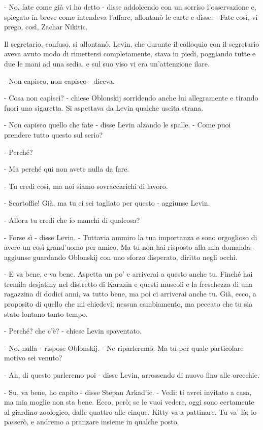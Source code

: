 - No, fate come già vi ho detto - disse addolcendo con un sorriso l'osservazione e, spiegato in breve come intendeva l'affare, allontanò le carte e disse: - Fate così, vi prego, così, Zachar Nikitic. 

Il segretario, confuso, si allontanò. Levin, che durante il colloquio con il segretario aveva avuto modo di rimettersi completamente, stava in piedi, poggiando tutte e due le mani ad una sedia, e sul suo viso vi era un'attenzione ilare. 

- Non capisco, non capisco - diceva. 

- Cosa non capisci? - chiese Oblonskij sorridendo anche lui allegramente e tirando fuori una sigaretta. Si aspettava da Levin qualche uscita strana. 

- Non capisco quello che fate - disse Levin alzando le spalle. - Come puoi prendere tutto questo sul serio? 

- Perché? 

- Ma perché qui non avete nulla da fare. 

- Tu credi così, ma noi siamo sovraccarichi di lavoro. 

- Scartoffie! Già, ma tu ci sei tagliato per questo - aggiunse Levin. 

- Allora tu credi che io manchi di qualcosa? 

- Forse sì - disse Levin. - Tuttavia ammiro la tua importanza e sono orgoglioso di avere un così grand'uomo per amico. Ma tu non hai risposto alla mia domanda - aggiunse guardando Oblonskij con uno sforzo disperato, diritto negli occhi. 

- E va bene, e va bene. Aspetta un po' e arriverai a questo anche tu. Finché hai tremila desjatiny nel distretto di Karazin e questi muscoli e la freschezza di una ragazzina di dodici anni, va tutto bene, ma poi ci arriverai anche tu. Già, ecco, a proposito di quello che mi chiedevi; nessun cambiamento, ma peccato che tu sia stato lontano tanto tempo. 

- Perché? che c'è? - chiese Levin spaventato. 

- No, nulla - rispose Oblonskij. - Ne riparleremo. Ma tu per quale particolare motivo sei venuto? 

- Ah, di questo parleremo poi - disse Levin, arrossendo di nuovo fino alle orecchie. 

- Su, va bene, ho capito - disse Stepan Arkad'ic. - Vedi: ti avrei invitato a casa, ma mia moglie non sta bene. Ecco, però; se le vuoi vedere, oggi sono certamente al giardino zoologico, dalle quattro alle cinque. Kitty va a pattinare. Tu va' là; io passerò, e andremo a pranzare insieme in qualche posto. 

